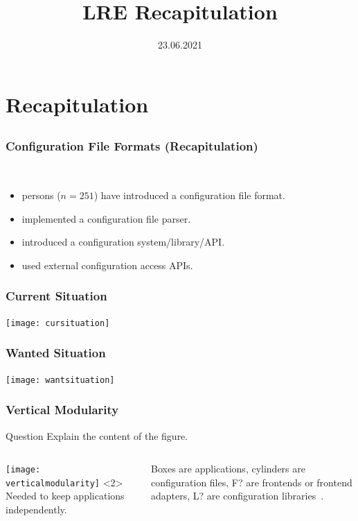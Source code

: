 

\title{LRE Recapitulation}
\date{23.06.2021}




\section{Recapitulation}

\subsection{}

\begin{frame}
	\frametitle{Configuration File Formats (Recapitulation)}
	\methodQuestion{} ~\cite{raab2017challenges}
	\pause
	\begin{itemize}
	\item {} persons ($n=251$) have introduced a configuration file format.
	\item {} implemented a configuration file parser.
	\item {} introduced a configuration system/library/API.
	\item {} used external configuration access APIs.
	\end{itemize}
\end{frame}

\begin{frame}
	\frametitle{Current Situation}
	\texttt{[image: cursituation]}
\end{frame}

\begin{frame}
	\frametitle{Wanted Situation}
	\texttt{[image: wantsituation]}
\end{frame}

\begin{frame}
	\frametitle{Vertical Modularity}
	\begin{alertblock}{Question}
	Explain the content of the figure.
	\end{alertblock}
	\begin{columns}[c]
	\column{7cm}
	\texttt{[image: verticalmodularity]}
	Needed to keep applications independently.

	Boxes are applications, cylinders are configuration files, F? are frontends or frontend adapters, L? are configuration libraries~\cite{raab2016improving}.
	\end{columns}
\end{frame}

